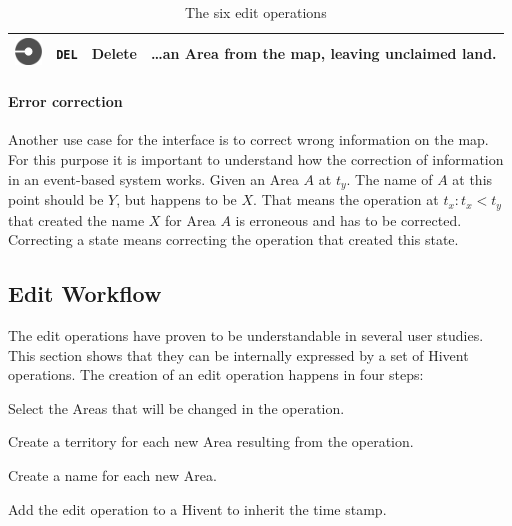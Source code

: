 \begin{table}[H]
\begin{center}
\begin{tabular}{m{0.75cm} m{0.8cm} m{2.4cm} m{9.1cm}}
  \midrule
  \vspace{0.35em}
  \raisebox{-0.35\height}
  {\includegraphics[width=0.72cm]{graphics/development/editing_hivent_data/edit_operations/DEL}} &
  \texttt{DEL} & Delete &
  \dots an Area from the map, leaving unclaimed land. \\

  \bottomrule
\end{tabular}
\caption{The six edit operations}
\label{tab:edit_operations}
\end{center}
\end{table}

\paragraph{Error correction} %
\label{par:error_correction}

Another use case for the interface is to correct wrong information on the map. For this purpose it is important to understand how the correction of information in an event-based system works. Given an Area $A$ at $t_y$. The name of $A$ at this point should be $Y$, but happens to be $X$. That means the operation at $t_x: t_x < t_y$ that created the name $X$ for Area $A$ is erroneous and has to be corrected. Correcting a state means correcting the operation that created this state.



\subsection{Edit Workflow} %
\label{sub:edit_workflow}

The edit operations have proven to be understandable in several user studies. This section shows that they can be internally expressed by a set of Hivent operations. The creation of an edit operation happens in four steps:

\begin{compactenum}
  \item Select the Areas that will be changed in the operation.
  \item Create a territory for each new Area resulting from the operation.
  \item Create a name for each new Area.
  \item Add the edit operation to a Hivent to inherit the time stamp.
\end{compactenum}

